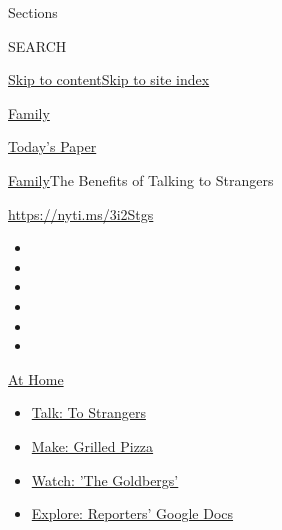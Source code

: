 Sections

SEARCH

\protect\hyperlink{site-content}{Skip to
content}\protect\hyperlink{site-index}{Skip to site index}

\href{https://www.nytimes3xbfgragh.onion/section/well/family}{Family}

\href{https://myaccount.nytimes3xbfgragh.onion/auth/login?response_type=cookie\&client_id=vi}{}

\href{https://www.nytimes3xbfgragh.onion/section/todayspaper}{Today's
Paper}

\href{/section/well/family}{Family}\textbar{}The Benefits of Talking to
Strangers

\url{https://nyti.ms/3i2Stgs}

\begin{itemize}
\item
\item
\item
\item
\item
\item
\end{itemize}

\href{https://www.nytimes3xbfgragh.onion/spotlight/at-home?action=click\&pgtype=Article\&state=default\&region=TOP_BANNER\&context=at_home_menu}{At
Home}

\begin{itemize}
\tightlist
\item
  \href{https://www.nytimes3xbfgragh.onion/2020/08/03/well/family/the-benefits-of-talking-to-strangers.html?action=click\&pgtype=Article\&state=default\&region=TOP_BANNER\&context=at_home_menu}{Talk:
  To Strangers}
\item
  \href{https://www.nytimes3xbfgragh.onion/2020/08/01/at-home/coronavirus-make-pizza-on-a-grill.html?action=click\&pgtype=Article\&state=default\&region=TOP_BANNER\&context=at_home_menu}{Make:
  Grilled Pizza}
\item
  \href{https://www.nytimes3xbfgragh.onion/2020/07/31/arts/television/goldbergs-abc-stream.html?action=click\&pgtype=Article\&state=default\&region=TOP_BANNER\&context=at_home_menu}{Watch:
  'The Goldbergs'}
\item
  \href{https://www.nytimes3xbfgragh.onion/interactive/2020/at-home/even-more-reporters-editors-diaries-lists-recommendations.html?action=click\&pgtype=Article\&state=default\&region=TOP_BANNER\&context=at_home_menu}{Explore:
  Reporters' Google Docs}
\end{itemize}

